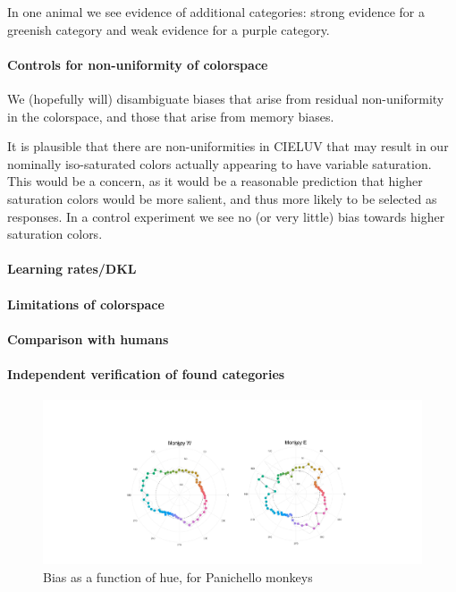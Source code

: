 In one animal we see evidence of additional categories: strong evidence for a greenish category and weak evidence for a purple category.


\paragraph{Controls for non-uniformity of colorspace}

We (hopefully will) disambiguate biases that arise from residual non-uniformity in the colorspace, and those that arise from memory biases.

It is plausible that there are non-uniformities in CIELUV that may result in our nominally iso-saturated colors actually appearing to have variable saturation. This would be a concern, as it would be a reasonable prediction that higher saturation colors would be more salient, and thus more likely to be selected as responses. In a control experiment we see no (or very little) bias towards higher saturation colors.



\paragraph{Learning rates/DKL}
\paragraph{Limitations of colorspace}
\paragraph{Comparison with humans} %
\paragraph{Independent verification of found categories}

\begin{figure}
\includegraphics[width=\textwidth]{../../Figures/Old/panichellobias.pdf}
\caption{Bias as a function of hue, for Panichello monkeys} 
\end{figure}


